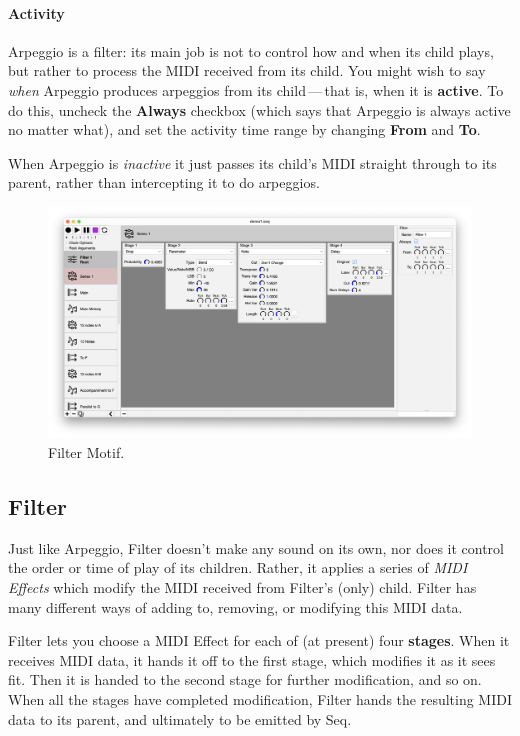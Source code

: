 \documentclass[twoside,10pt]{article}
\newcommand\bump{\vspace{10in}}
\begin{document}
\paragraph{Activity}

Arpeggio is a filter: its main job is not to control how and when its child plays, but rather to process the MIDI received from its child.  You might wish to say {\it when} Arpeggio produces arpeggios from its child\,---\,that is,  when it is {\bf active}.  To do this, uncheck the {\bf Always} checkbox (which says that Arpeggio is always active no matter what), and set the activity time range by changing {\bf From} and {\bf To}.  

When Arpeggio is {\it inactive} it just passes its child's MIDI straight through to its parent, rather than intercepting it to do arpeggios.

\bump

\begin{figure}[t]
\centering
\includegraphics[width=6.5in]{Filter}
\vspace{-2em}
\caption{Filter Motif.}
\label{filter}
\end{figure}

\subsection{Filter}

Just like Arpeggio, Filter doesn't make any sound on its own, nor does it control the order or time of play of its children.  Rather, it applies a series of {\it MIDI Effects} which modify the MIDI received from Filter's (only) child.  Filter has many different ways of adding to, removing, or modifying this MIDI data.  

Filter lets you choose a MIDI Effect for each of (at present) four {\bf stages}.  When it receives MIDI data, it hands it off to the first stage, which modifies it as it sees fit.  Then it is handed to the second stage for further modification, and so on.  When all the stages have completed modification, Filter hands the resulting MIDI data to its parent, and ultimately to be emitted by Seq.
\end{document}
